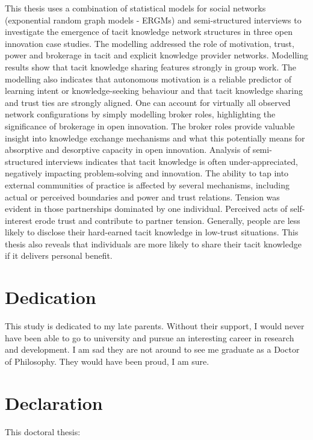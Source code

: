 \documentclass[12pt,table,xcdraw]{book}
\begin{document}
This thesis uses a combination of statistical models for social networks (exponential random graph models - ERGMs) and semi-structured interviews to investigate the emergence of tacit knowledge network structures in three open innovation case studies. The modelling addressed the role of motivation, trust, power and brokerage in tacit and explicit knowledge provider networks. Modelling results show that tacit knowledge sharing features strongly in group work. The modelling also indicates that autonomous motivation is a reliable predictor of learning intent or knowledge-seeking behaviour and that tacit knowledge sharing and trust ties are strongly aligned. One can account for virtually all observed network configurations by simply modelling broker roles, highlighting the significance of brokerage in open innovation. The broker roles provide valuable insight into knowledge exchange mechanisms and what this potentially means for absorptive and desorptive capacity in open innovation. Analysis of semi-structured interviews indicates that tacit knowledge is often under-appreciated, negatively impacting problem-solving and innovation. The ability to tap into external communities of practice is affected by several mechanisms, including actual or perceived boundaries and power and trust relations. Tension was evident in those partnerships dominated by one individual. Perceived acts of self-interest erode trust and contribute to partner tension. Generally, people are less likely to disclose their hard-earned tacit knowledge in low-trust situations. This thesis also reveals that individuals are more likely to share their tacit knowledge if it delivers personal benefit.

\chapter*{Dedication}

This study is dedicated to my late parents. Without their support, I would never have been able to go to university and pursue an interesting career in research and development. I am sad they are not around to see me graduate as a Doctor of Philosophy. They would have been proud, I am sure.

\chapter*{Declaration}

This doctoral thesis:
\end{document}

